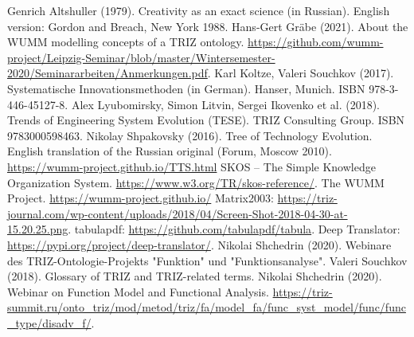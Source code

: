 \documentclass[11pt,a4paper]{article}
\begin{document}
\begin{thebibliography}{xxx}
\raggedright
{} Genrich Altshuller (1979).  Creativity as an exact
  science (in Russian). English version: Gordon and Breach, New York 1988.
 Hans-Gert Gr\"abe (2021). About the WUMM modelling
  concepts of a TRIZ ontology.
  \url{https://github.com/wumm-project/Leipzig-Seminar/blob/master/Wintersemester-2020/Seminararbeiten/Anmerkungen.pdf}.
 Karl Koltze, Valeri Souchkov (2017).  Systematische
  Innovationsmethoden (in German).  Hanser, Munich. ISBN 978-3-446-45127-8.
 Alex Lyubomirsky, Simon Litvin, Sergei Ikovenko et al.
  (2018). Trends of Engineering System Evolution (TESE).  TRIZ Consulting
  Group. ISBN 9783000598463.
 Nikolay Shpakovsky (2016). Tree of Technology
  Evolution. English translation of the Russian original (Forum, Moscow
  2010).\\ \url{https://wumm-project.github.io/TTS.html}
 SKOS -- The Simple Knowledge Organization System.
  \url{https://www.w3.org/TR/skos-reference/}.  
 The WUMM Project. \url{https://wumm-project.github.io/} 
 Matrix2003:
  \url{https://triz-journal.com/wp-content/uploads/2018/04/Screen-Shot-2018-04-30-at-15.20.25.png}.
 tabulapdf: \url{https://github.com/tabulapdf/tabula}.
 Deep Translator:
  \url{https://pypi.org/project/deep-translator/}.
 Nikolai Shchedrin (2020). Webinare des
  TRIZ-Ontologie-Projekts "Funktion" und "Funktionsanalyse".
 Valeri Souchkov (2018). Glossary of TRIZ and TRIZ-related terms.
 Nikolai Shchedrin (2020).
  Webinar on Function Model and Functional Analysis.
  \url{https://triz-summit.ru/onto_triz/mod/metod/triz/fa/model_fa/func_syst_model/func/func_type/disadv_f/}.
\end{thebibliography}
\end{document}
